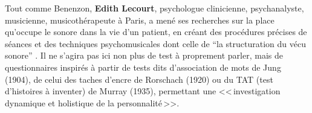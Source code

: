 




   Tout comme Benenzon, \textbf{Edith Lecourt}, psychologue clinicienne,
      psychanalyste, musicienne, musicothérapeute à Paris, a mené ses recherches sur la place qu'occupe le sonore dans la vie d'un
        patient, en créant des procédures précises de séances et des techniques psychomusicales dont celle de \enquote{la structuration du vécu sonore} \autocite[p.119] {lecourt_les_2017}.
        Il ne s'agira pas ici non plus de test à proprement parler, mais de questionnaires inspirés à partir de tests dits
        d'association de mots de Jung (1904), de celui des taches
        d'encre de Rorschach (1920) ou du TAT (test d'histoires à
        inventer) de Murray (1935), permettant une <<\,investigation dynamique et holistique de la
              personnalité\,>>\autocite[p.~13] {anzieu.chabert:methodes}.



